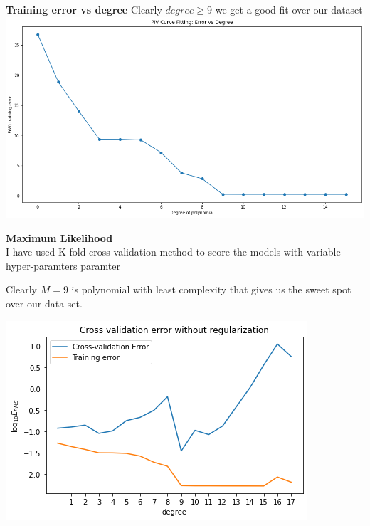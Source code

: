 \documentclass[11pt]{beamer}
\begin{document}
\begin{frame}
\textbf{Training error vs degree}
Clearly $degree \geq 9 $ we get a good fit over our dataset
\includegraphics[scale=0.27]{images/15.png}
\end{frame}


\begin{frame}
\textbf{Maximum Likelihood }\\
I have used K-fold cross validation method to score the models with variable hyper-paramters
paramter 

Clearly $M=9$ is polynomial with least complexity that gives us the sweet spot over our data set.

\includegraphics[scale=0.50]{images/16.png}
\end{frame}
\end{document}
